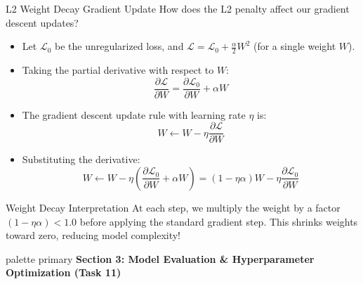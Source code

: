 \documentclass[9pt]{beamer}
\begin{document}
\begin{frame}{L2 Weight Decay Gradient Update}
  How does the L2 penalty affect our gradient descent updates?
  \begin{itemize}
    \item Let $\mathcal{L}_0$ be the unregularized loss, and $\mathcal{L} = \mathcal{L}_0 + \frac{\alpha}{2} W^2$ (for a single weight $W$).
    \item Taking the partial derivative with respect to $W$:
      $$\frac{\partial \mathcal{L}}{\partial W} = \frac{\partial \mathcal{L}_0}{\partial W} + \alpha W$$
    \item The gradient descent update rule with learning rate $\eta$ is:
      $$W \leftarrow W - \eta \frac{\partial \mathcal{L}}{\partial W}$$
    \item Substituting the derivative:
      $$W \leftarrow W - \eta \left( \frac{\partial \mathcal{L}_0}{\partial W} + \alpha W \right) = (1 - \eta \alpha) W - \eta \frac{\partial \mathcal{L}_0}{\partial W}$$
  \end{itemize}
  \begin{block}{Weight Decay Interpretation}
    At each step, we multiply the weight by a factor $(1 - \eta \alpha) < 1.0$ before applying the standard gradient step. This shrinks weights toward zero, reducing model complexity!
  \end{block}
\end{frame}

\begin{frame}[plain]
  \vfill
  \centering
  \begin{beamercolorbox}[sep=8pt,center,shadow=true,rounded=true]{palette primary}
    \textbf{Section 3: Model Evaluation \& Hyperparameter Optimization (Task 11)}
  \end{beamercolorbox}
  \vfill
\end{frame}
\end{document}

